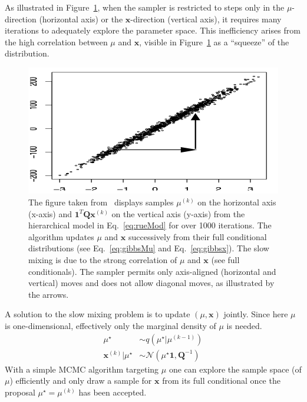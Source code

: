 As illustrated in Figure~\ref{fig:RueHeld}, when the sampler is restricted to steps only in the $\mu$-direction (horizontal axis) or the $\bm{x}$-direction (vertical axis), it requires many iterations to adequately explore the parameter space. 
This inefficiency arises from the high correlation between $\mu$ and $\bm{x}$, visible in Figure~\ref{fig:RueHeld} as a ``squeeze'' of the distribution.
\begin{figure}[ht!]
	\centering
	\includegraphics[width = \textwidth]{Figures/RueHeldBookFig.png}
	\caption[Correlation structure in between parameters and hyper-parameters]{The figure taken from~\cite[Figure 4.1 (b)]{rue2005gaussian} displays samples $\mu^{(k)}$ on the horizontal axis (x-axis) and $\bm{1}^T \bm{Q} \bm{x}^{(k)}$ on the vertical axis (y-axis) from the hierarchical model in Eq.~\ref{eq:rueMod} for over 1000 iterations.
		The algorithm updates $\mu$ and $\bm{x}$ successively from their full conditional distributions (see Eq.~\ref{eq:gibbsMu} and Eq.~\ref{eq:gibbsx}). The slow mixing is due to the strong correlation of $\mu$ and $\bm{x}$ (see full conditionals).
		The sampler permits only axis-aligned (horizontal and vertical) moves and does not allow diagonal moves, as illustrated by the arrows.}
	\label{fig:RueHeld}
\end{figure}

A solution to the slow mixing problem is to update $(\mu, \bm{x})$ jointly.
Since here $\mu$ is one-dimensional, effectively only the marginal density of $\mu$ is needed.
\begin{align}
	\mu^{\star}  &\sim q (\mu^{\star}|	\mu^{(k-1)} ) \\
	\bm{x}^{(k)} | \mu^{\star} &\sim \mathcal{N} (	\mu^{\star}\bm{1}, \bm{Q}^{-1}) 
\end{align}
With a simple MCMC algorithm targeting $ \mu$ one can explore the sample space (of $ \mu$) efficiently and only draw a sample for $\bm{x}$ from its full conditional once the proposal $\mu^{\star} =\mu^{(k)} $ has been accepted.

